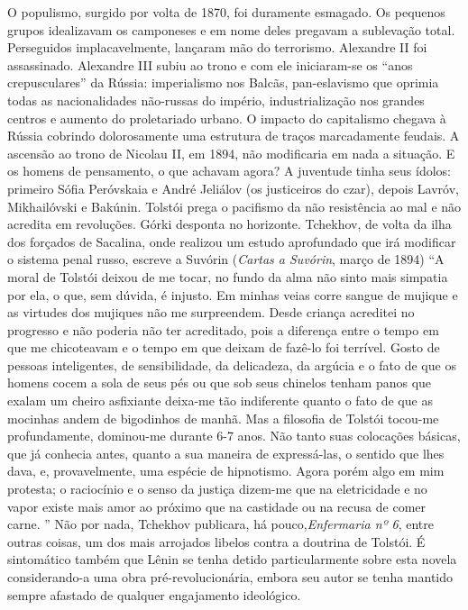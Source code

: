 O populismo, surgido por volta de 1870, foi duramente esmagado. Os
pequenos grupos idealizavam os camponeses e em nome deles pregavam a
sublevação total. Perseguidos implacavelmente, lançaram mão do
terrorismo. Alexandre II foi assassinado. Alexandre III subiu ao trono e
com ele iniciaram-se os ``anos crepusculares'' da Rússia: imperialismo
nos Balcãs, pan-eslavismo que oprimia todas as nacionalidades não-russas
do império, industrialização nos grandes centros e aumento do
proletariado urbano. O impacto do capitalismo chegava à Rússia cobrindo
dolorosamente uma estrutura de traços marcadamente feudais. A ascensão
ao trono de Nicolau II, em 1894, não modificaria em nada a situação. E
os homens de pensamento, o que achavam agora? A juventude tinha seus
ídolos: primeiro Sófia Peróvskaia e André Jeliálov (os justiceiros do
czar), depois Lavróv, Mikhailóvski e Bakúnin. Tolstói prega o pacifismo
da não resistência ao mal e não acredita em revoluções. Górki desponta
no horizonte. Tchekhov, de volta da ilha dos forçados de Sacalina, onde
realizou um estudo aprofundado que irá modificar o sistema penal russo,
escreve a Suvórin (\emph{Cartas a Suvórin}, março de 1894) ``A moral de
Tolstói deixou de me tocar, no fundo da alma não sinto mais simpatia por
ela, o que, sem dúvida, é injusto. Em minhas veias corre sangue de
mujique e as virtudes dos mujiques não me surpreendem. Desde criança
acreditei no progresso e não poderia não ter acreditado, pois a
diferença entre o tempo em que me chicoteavam e o tempo em que deixam de
fazê-lo foi terrível. Gosto de pessoas inteligentes, de sensibilidade,
da delicadeza, da argúcia e o fato de que os homens cocem a sola de seus
pés ou que sob seus chinelos tenham panos que exalam um cheiro
asfixiante deixa-me tão indiferente quanto o fato de que as mocinhas
andem de bigodinhos de manhã. Mas a filosofia de Tolstói tocou-me
profundamente, dominou-me durante 6-7 anos. Não tanto suas colocações
básicas, que já conhecia antes, quanto a sua maneira de expressá-las, o
sentido que lhes dava, e, provavelmente, uma espécie de hipnotismo.
Agora porém algo em mim protesta; o raciocínio e o senso da justiça
dizem-me que na eletricidade e no vapor existe mais amor ao próximo que
na castidade ou na recusa de comer carne. '' Não por nada, Tchekhov
publicara, há pouco,\emph{Enfermaria nº 6}, entre outras coisas, um dos
mais arrojados libelos contra a doutrina de Tolstói. É sintomático
também que Lênin se tenha detido particularmente sobre esta novela
considerando-a uma obra pré-revolucionária, embora seu autor se tenha
mantido sempre afastado de qualquer engajamento ideológico.

